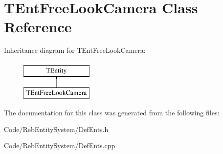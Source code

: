 \hypertarget{class_t_ent_free_look_camera}{}\section{T\+Ent\+Free\+Look\+Camera Class Reference}
\label{class_t_ent_free_look_camera}
Inheritance diagram for T\+Ent\+Free\+Look\+Camera\+:\begin{figure}[H]
\begin{center}
\leavevmode
\includegraphics[height=2.000000cm]{class_t_ent_free_look_camera}
\end{center}
\end{figure}


The documentation for this class was generated from the following files\+:\begin{DoxyCompactItemize}
\item 
Code/\+Reb\+Entity\+System/Def\+Ents.\+h\item 
Code/\+Reb\+Entity\+System/Def\+Ents.\+cpp\end{DoxyCompactItemize}
